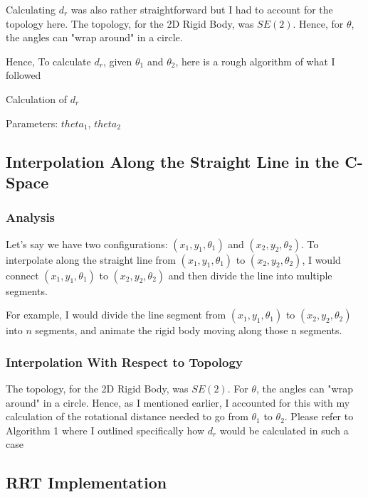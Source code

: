 \documentclass{article}
\begin{document}
Calculating $d_r$ was also rather straightforward but I had to account for the topology here. The topology, for the 2D Rigid Body, was $SE(2)$. Hence, for $\theta$, the angles can "wrap around" in a circle. 

Hence, To calculate $d_r$, given $\theta_1$ and $\theta_2$, here is a rough algorithm of what I followed


\begin{algorithm}
\caption{Calculation of $d_r$}
\begin{algorithmic}
\STATE Parameters: $theta_1$, $theta_2$


\end{algorithmic}
\end{algorithm}


\subsection{Interpolation Along the Straight Line in the C-Space}
\subsubsection{Analysis}
Let's say we have two configurations: $(x_1, y_1, \theta_1)$ and $(x_2, y_2, \theta_2)$. To interpolate along the straight line from $(x_1, y_1, \theta_1)$ to  $(x_2, y_2, \theta_2)$, I would connect $(x_1, y_1, \theta_1)$ to  $(x_2, y_2, \theta_2)$ and then divide the line into multiple segments. \newline 

For example, I would divide the line segment from $(x_1, y_1, \theta_1)$ to  $(x_2, y_2, \theta_2)$ into $n$ segments, and animate the rigid body moving along those n segments. 

\subsubsection{Interpolation With Respect to Topology}
The topology, for the 2D Rigid Body, was $SE(2)$. For $\theta$, the angles can "wrap around" in a circle. Hence, as I mentioned earlier, I accounted for this with my calculation of the rotational distance needed to go from $\theta_1$ to $\theta_2$. Please refer to Algorithm 1 where I outlined specifically how $d_r$ would be calculated in such a case 

\subsection{RRT Implementation}
\end{document}
